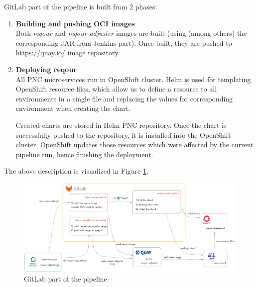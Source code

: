 \documentclass[../main.tex]{subfiles}
\begin{document}
GitLab part of the pipeline is built from 2 phases:
\begin{enumerate}
    \item \textbf{Building and pushing OCI images}\\
    Both \textit{reqour} and \textit{reqour-adjuster} images are built (using (among others) the corresponding JAR from Jenkins part). Once built, they are pushed to \url{https://quay.io/} image repository.
    \item \textbf{Deploying reqour}\\
    All PNC microservices run in OpenShift cluster. Helm is used for templating OpenShift resource files, which allow us to define a resource to all environments in a single file and replacing the values for corresponding environment when creating the chart.

    Created charts are stored in Helm PNC repository. Once the chart is successfully pushed to the repository, it is installed into the OpenShift cluster. OpenShift updates those resources which were affected by the current pipeline run, hence finishing the deployment.
\end{enumerate}

The above description is visualized in Figure \ref{fig:gitlab}.

\begin{figure}
  \begin{center}
    \includegraphics[width=\textwidth]{images/gitlab.png}
  \end{center}
  \caption{GitLab part of the pipeline}
  \label{fig:gitlab}
\end{figure}
\end{document}
